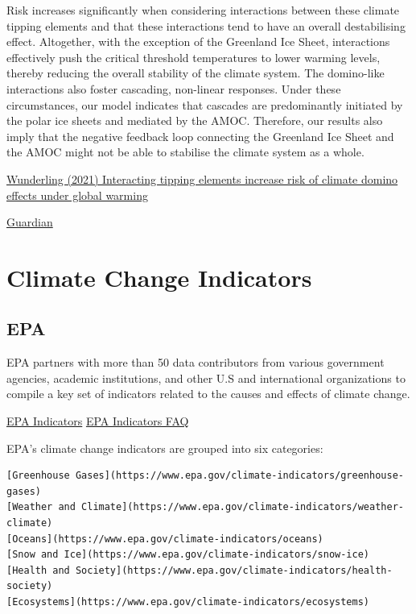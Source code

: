 \documentclass[
]{book}
\begin{document}
Risk increases significantly when considering interactions between these climate tipping elements and that these interactions tend to have an overall destabilising effect. Altogether, with the exception of the Greenland Ice Sheet, interactions effectively push the critical threshold temperatures to lower warming levels, thereby reducing the overall stability of the climate system. The domino-like interactions also foster cascading, non-linear responses. Under these circumstances, our model indicates that cascades are predominantly initiated by the polar ice sheets and mediated by the AMOC. Therefore, our results also imply that the negative feedback loop connecting the Greenland Ice Sheet and the AMOC might not be able to stabilise the climate system as a whole.

\href{https://esd.copernicus.org/articles/12/601/2021/}{Wunderling (2021) Interacting tipping elements increase risk of climate domino effects under global warming}

\href{https://www.theguardian.com/environment/2021/jun/03/climate-tipping-points-could-topple-like-dominoes-warn-scientists}{Guardian}

\hypertarget{climate-change-indicators}{%
\chapter{Climate Change Indicators}\label{climate-change-indicators}}

\hypertarget{epa}{%
\section{EPA}\label{epa}}

EPA partners with more than 50 data contributors from various government agencies, academic institutions, and other U.S and international organizations to compile a key set of indicators related to the causes and effects of climate change.

\href{https://www.epa.gov/climate-indicators}{EPA Indicators}
\href{https://www.epa.gov/climate-indicators/frequent-questions-about-climate-change-indicators}{EPA Indicators FAQ}

EPA's climate change indicators are grouped into six categories:

\begin{verbatim}
[Greenhouse Gases](https://www.epa.gov/climate-indicators/greenhouse-gases)
[Weather and Climate](https://www.epa.gov/climate-indicators/weather-climate)
[Oceans](https://www.epa.gov/climate-indicators/oceans)
[Snow and Ice](https://www.epa.gov/climate-indicators/snow-ice)
[Health and Society](https://www.epa.gov/climate-indicators/health-society)
[Ecosystems](https://www.epa.gov/climate-indicators/ecosystems)
\end{verbatim}
\end{document}
